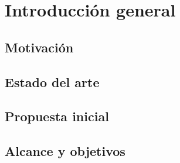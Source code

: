 \chapter{Introducción general}

\label{cap:IntroGeneral}

\section{Motivación}
\section{Estado del arte}
\section{Propuesta inicial}
\section{Alcance y objetivos}
